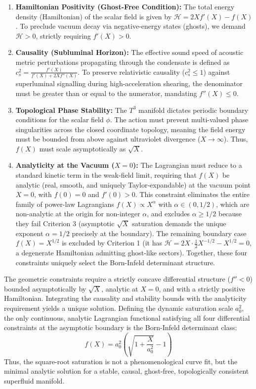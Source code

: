 \documentclass[aps,prd,10pt,twocolumn,superscriptaddress,nofootinbib,floatfix]{revtex4-2}
\begin{document}
\begin{enumerate}
    \item \textbf{Hamiltonian Positivity (Ghost-Free Condition):} The total energy density (Hamiltonian) of the scalar field is given by $\mathcal{H} = 2X f'(X) - f(X)$. To preclude vacuum decay via negative-energy states (ghosts), we demand $\mathcal{H} > 0$, strictly requiring $f'(X) > 0$.
    \item \textbf{Causality (Subluminal Horizon):} The effective sound speed of acoustic metric perturbations propagating through the condensate is defined as $c_s^2 = \frac{f'(X)}{f'(X) + 2X f''(X)}$. To preserve relativistic causality ($c_s^2 \le 1$) against superluminal signalling during high-acceleration shearing, the denominator must be greater than or equal to the numerator, mandating $f''(X) \le 0$.
    \item \textbf{Topological Phase Stability:} The $T^3$ manifold dictates periodic boundary conditions for the scalar field $\phi$. The action must prevent multi-valued phase singularities across the closed coordinate topology, meaning the field energy must be bounded from above against ultraviolet divergence ($X \to \infty$). Thus, $f(X)$ must scale asymptotically as $\sqrt{X}$.
    \item \textbf{Analyticity at the Vacuum ($X = 0$):} The Lagrangian must reduce to a standard kinetic term in the weak-field limit, requiring that $f(X)$ be analytic (real, smooth, and uniquely Taylor-expandable) at the vacuum point $X = 0$, with $f(0) = 0$ and $f'(0) > 0$. This constraint eliminates the entire family of power-law Lagrangians $f(X) \propto X^\alpha$ with $\alpha \in (0, 1/2)$, which are non-analytic at the origin for non-integer $\alpha$, and excludes $\alpha \ge 1/2$ because they fail Criterion 3 (asymptotic $\sqrt{X}$ saturation demands the unique exponent $\alpha = 1/2$ precisely at the boundary). The remaining boundary case $f(X) = X^{1/2}$ is excluded by Criterion 1 (it has $\mathcal{H} = 2X \cdot \frac{1}{2} X^{-1/2} - X^{1/2} = 0$, a degenerate Hamiltonian admitting ghost-like sectors). Together, these four constraints uniquely select the Born-Infeld determinant structure.
\end{enumerate}

The geometric constraints require a strictly concave differential structure ($f'' < 0$) bounded asymptotically by $\sqrt{X}$, analytic at $X=0$, and with a strictly positive Hamiltonian. Integrating the causality and stability bounds with the analyticity requirement yields a unique solution. Defining the dynamic saturation scale $a_0^2$, the only continuous, analytic Lagrangian functional satisfying all four differential constraints at the asymptotic boundary is the Born-Infeld determinant class:
\begin{equation}
f(X) = a_0^2 \left(\sqrt{1+\frac{X}{a_0^2}} - 1\right)
\end{equation}
Thus, the square-root saturation is not a phenomenological curve fit, but the minimal analytic solution for a stable, causal, ghost-free, topologically consistent superfluid manifold.
\end{document}
